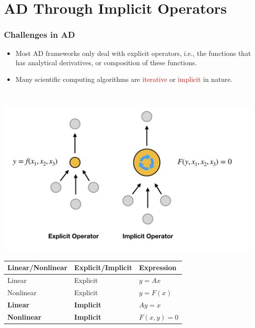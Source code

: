 \documentclass{beamer}
\begin{document}
\section{AD Through Implicit Operators}

\begin{frame}
\frametitle{Challenges in AD}
	
	
	\begin{minipage}[t]{0.49\textwidth}
	\vspace{-3cm}
\begin{itemize}
	\item Most AD frameworks only deal with explicit operators, i.e., the functions that has analytical derivatives, or composition of these functions. 
	\item Many scientific computing algorithms are \textcolor{red}{iterative} or \textcolor{red}{implicit} in nature.
\end{itemize}
\end{minipage}~
\begin{minipage}[t]{0.49\textwidth}
  \includegraphics[width=1.0\textwidth]{figures/sim.png}
\end{minipage}

\begin{table}[]
\begin{tabular}{@{}lll@{}}
\toprule
Linear/Nonlinear & Explicit/Implicit & Expression   \\ \midrule
Linear           & Explicit          & $y=Ax$       \\
Nonlinear        & Explicit          & $y = F(x)$   \\
\textbf{Linear}           & \textbf{Implicit}          & $Ay = x$     \\
\textbf{Nonlinear}        & \textbf{Implicit}          & $F(x,y) = 0$ \\ \bottomrule
\end{tabular}
\end{table}
\end{frame}
\end{document}
